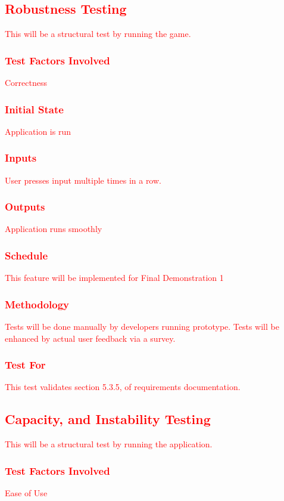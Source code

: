 \documentclass[11pt, oneside]{article}   	%
\begin{document}
\subsection{\textcolor{red}{Robustness Testing}}
\textcolor{red}{This will be a structural test by running the game.}
\subsubsection{\textcolor{red}{Test Factors Involved}}
\textcolor{red}{Correctness}
\subsubsection{\textcolor{red}{Initial State}}
\textcolor{red}{Application is run}
\subsubsection{\textcolor{red}{Inputs}}
\textcolor{red}{User presses input multiple times in a row.}
\subsubsection{\textcolor{red}{Outputs}}
\textcolor{red}{Application runs smoothly}
\subsubsection{\textcolor{red}{Schedule}}
\textcolor{red}{This feature will be implemented for Final Demonstration 1}
\subsubsection{\textcolor{red}{Methodology}}
\textcolor{red}{Tests will be done manually by developers running prototype. Tests will be enhanced by actual user feedback via a survey.}
\subsubsection{\textcolor{red}{Test For}}
\textcolor{red}{This test validates section 5.3.5, of requirements documentation.}


\subsection{\textcolor{red}{Capacity, and Instability Testing}}
\textcolor{red}{This will be a structural test by running the application.}
\subsubsection{\textcolor{red}{Test Factors Involved}}
\textcolor{red}{Ease of Use}
\end{document}
